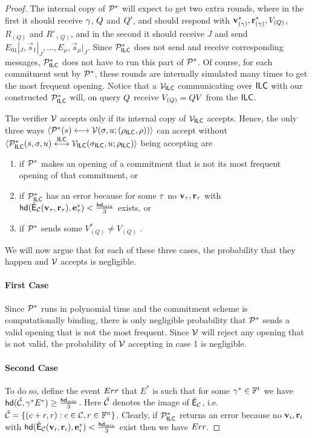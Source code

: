 \begin{proof}
The internal copy of $\mathcal{P}^*$ will expect to get two extra rounds, where in the first it should receive ${\mathbf{\gamma}}$, $Q$ and $Q'$, and should respond with ${\mathbf{v}}_{({\mathbf{\gamma}})}^*,\mathbf{r}_{({\mathbf{\gamma}})}^*,V_{(Q)}$, $R_{(Q)}$ and $R'_{(Q)}$, and in the second it should receive $J$ and send $E_{01}|_J,\vec{s}_1|_J,\ldots,E_\mu,\vec{s}_\mu|_J$.
Since $\mathcal{P}_{\mathsf{ILC}}^*$ does not send and receive corresponding messages, $\mathcal{P}_{\mathsf{ILC}}^*$ does not have to run this part of $\mathcal{P}^*$. Of course, for each commitment sent by $\mathcal{P}^*$, these rounds are internally simulated many times to get the most frequent opening. Notice that a $\mathcal{V}_{\mathsf{ILC}}$ communicating over $\mathsf{ILC}$ with our constructed $\mathcal{P}_{\mathsf{ILC}}^*$ will, on query $Q$ receive $V_{(Q)}=Q V$ from the $\mathsf{ILC}$.



The verifier $\mathcal{V}$ accepts only if its internal copy of $\mathcal{V}_{\mathsf{ILC}}$ accepts. Hence, the only three ways $ \langle \mathcal{P}^*(s)\longleftrightarrow\mathcal{V}(\mathsf{\sigma},u;(\rho_{\mathsf{ILC}},\rho))\rangle$ can accept without %
$\langle \mathcal{P}_{\mathsf{ILC}}^*(s,\mathsf{\sigma},u)\overset{\mathsf{ILC}}{\longleftrightarrow}\mathcal{V}_{\mathsf{ILC}}(\mathsf{\sigma}_{\mathsf{ILC}},u;\rho_{\mathsf{ILC}})\rangle$ being accepting are 
\begin{enumerate}
\item if $\mathcal{P}^*$ makes an opening of a commitment that is not its most frequent opening of that commitment, or
\item if $\mathcal{P}_{\mathsf{ILC}}^*$ has an error because for some $\tau$ no ${\mathbf{v}}_\tau,\mathbf{r}_\tau$ with $\mathsf{hd}(\tilde{\mathsf{E}}_{\mathcal{C}}({\mathbf{v}}_\tau,\mathbf{r}_\tau),\mathbf{e}^*_\tau)< \frac{\mathsf{hd}_{\mathrm{min}}}{3}$ exists, or
\item if $\mathcal{P}^*$ sends some $V_{(Q)}^*\neq V_{(Q)}$ .
\end{enumerate}
We will now argue that for each of these three cases, the probability that they happen and $\mathcal{V}$ accepts is negligible.

\paragraph{First Case} Since $\mathcal{P}^*$ runs in polynomial time and the commitment scheme is computationally binding, there is only negligible probability that $\mathcal{P}^*$ sends a valid opening that is not the most frequent. Since $\mathcal{V}$ will reject any opening that is not valid, the probability of $\mathcal{V}$ accepting in case 1 is negligible. 

\paragraph{Second Case} To do so, define the event $Err$ that $E^*$ is such that for some ${\mathbf{\gamma}}^*\in \mathbb{F}^{{t_{}}}$ we have $\mathsf{hd}(\tilde{\mathcal{C}}, {{\mathbf{\gamma}}^*} E^*)\geq \frac{\mathsf{hd}_{\mathrm{min}}}{3}$. Here $\tilde{\mathcal{C}}$ denotes the image of $\tilde{\mathsf{E}}_{\mathcal{C}}$, i.e. $\tilde{\mathcal{C}}=\{(c+r,r):c\in \mathcal{C}, r\in \mathbb{F}^n\}$. Clearly, if $\mathcal{P}_{\mathsf{ILC}}^*$ returns an error because no ${\mathbf{v}}_i,\mathbf{r}_i$ with $\mathsf{hd}(\tilde{\mathsf{E}}_{\mathcal{C}}({\mathbf{v}}_i,\mathbf{r}_i),\mathbf{e}^*_i)< \frac{\mathsf{hd}_{\mathrm{min}}}{3}$ exist then we have $Err$. 


\end{proof}
